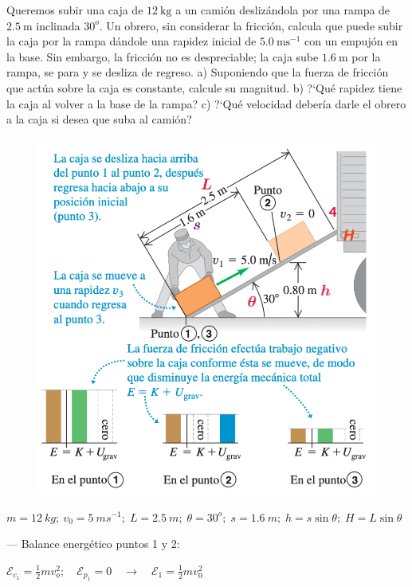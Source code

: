 \begin{prob}

Queremos subir una caja de $12 \ \mathrm{kg}$ a un camión deslizándola por una rampa de $2.5 \ \mathrm{m}$ inclinada $30^o$. Un obrero, sin considerar la fricción, calcula que puede subir la caja por la rampa dándole una rapidez inicial de $5.0 \ \mathrm{ms}^{-1}$ con un empujón en la base. Sin embargo, la fricción no es despreciable; la caja sube $1.6 \ \mathrm{m}$ por la rampa, se para y se desliza de regreso. a) Suponiendo que la fuerza de fricción que actúa sobre la caja es constante, calcule su magnitud. b) ?`Qué rapidez tiene la caja al volver a la base de la rampa? c) ?`Qué velocidad debería darle el obrero a la caja si desea que suba al camión?
	
\end{prob}

\begin{figure}[H]
	\centering
	\includegraphics[width=.85\textwidth]{imagenes/imagenes04/T04IM17.png}
\end{figure}
	
$m=12\ {kg}; \ v_0=5 \ {ms}^{-1}; \; L=2.5\ {m};\; \theta=30^o;\; s=1.6\ {m};\; h=s \sin \theta;\; H=L\sin \theta$

\vspace{7mm} %
--- Balance energético puntos 1 y 2:

$\mathcal E_{c_1}=\frac 1 2 m v_o^2;\quad \mathcal E_{p_1}=0 \quad \to \quad \mathcal E_1=\frac 1 2 m v_0^2$

